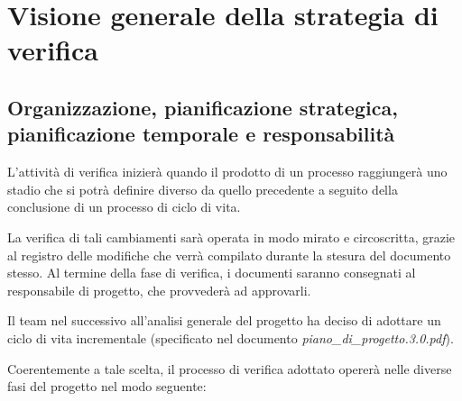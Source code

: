 \section{Visione generale della strategia di verifica}

\subsection{Organizzazione, pianificazione strategica, pianificazione temporale e responsabilità}
L'attività di verifica inizierà quando il prodotto di un processo raggiungerà uno stadio che si potrà definire diverso da quello precedente a seguito della conclusione di un processo di ciclo di vita.

La verifica di tali cambiamenti sarà operata in modo mirato e circoscritta, grazie al registro delle modifiche che verrà compilato durante la stesura del documento stesso. Al termine della fase di verifica, i documenti saranno consegnati al responsabile di progetto, che provvederà ad approvarli.

Il team nel \underline{} successivo all'analisi generale del progetto \caName{} ha deciso di adottare un ciclo di vita incrementale (specificato nel documento \textit{piano\_di\_progetto.3.0.pdf}).

Coerentemente a tale scelta, il processo di verifica adottato opererà nelle diverse fasi del progetto nel modo seguente:

